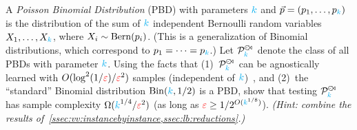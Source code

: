 \fi  %
\begin{question}\label{ex:testing:pbd}
\newcommand{\pbd}{\hspace{1pt}{\cdot}\kern -4pt {\subset}\kern -3pt {\rtimes}}
  A \emph{Poisson Binomial Distribution} (PBD) with parameters ${\textcolor{cyan}{k}}$ and $\vec{p}=(p_1,\dots,p_{\textcolor{cyan}{k}})$ is the distribution of the sum of ${\textcolor{cyan}{k}}$ independent Bernoulli random variables $X_1,\dots,X_{\textcolor{cyan}{k}}$, where $X_i \sim \operatorname{Bern}( p_i ) $. (This is a generalization of Binomial distributions, which correspond to $p_1=\dots=p_{\textcolor{cyan}{k}}$.) Let $\property^{\pbd}_{\ab}$ denote the class of all PBDs with parameter ${\textcolor{cyan}{k}}$. Using the facts that (1)~$\property^{\pbd}_{\ab}$ can be agnostically learned with $O(\log^2(1/\textcolor{red}{\varepsilon})/\textcolor{red}{\varepsilon}^2)$ samples (independent of ${\textcolor{cyan}{k}}$)~\citep{DDS:PBD:15}, and (2)~the ``standard'' Binomial distribution $\binomial{\ab}{1/2}$ is a PBD, show that testing $\property^{\pbd}_{\ab}$ has sample complexity $\Omega({\textcolor{cyan}{k}}^{1/4}/\textcolor{red}{\varepsilon}^2)$ (as long as $\textcolor{red}{\varepsilon} \geq 1/2^{O({\textcolor{cyan}{k}}^{1/8})}$). \textit{(Hint: combine the results of~\cref{ssec:vv:instancebyinstance,ssec:lb:reductions}.)}
\end{question}